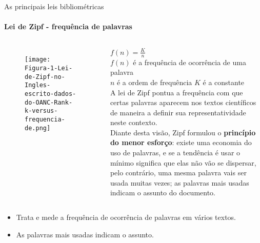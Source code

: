 \begin{frame}[t]{As principais leis bibliométricas}
    \framesubtitle{Lei de Zipf - frequência de palavras}
       
          

    \begin{columns}

        \begin{figure}
            \texttt{[image: Figura-1-Lei-de-Zipf-no-Ingles-escrito-dados-do-OANC-Rank-k-versus-frequencia-de.png]}
        \end{figure}

        \centering
        $f(n) = \frac{K}{n}$\\
        $f(n)$ \scriptsize{é a frequência de ocorrência de uma palavra}\\
        $n$ \scriptsize{é a ordem de frequência}
        $K$ \scriptsize{é a constante}\\

        A lei de Zipf pontua a frequência com que certas palavras aparecem nos textos científicos de maneira a definir sua representatividade neste contexto.\\
        \scriptsize{
            Diante desta visão, Zipf formulou o \textbf{princípio do menor esforço}: existe uma economia do uso de palavras, e se a tendência é usar o mínimo significa que elas não vão se dispersar, pelo contrário, uma mesma palavra vais ser usada muitas vezes; as palavras mais usadas indicam o assunto do documento.
        }
    \end{columns}

    \vspace*{0.2cm}
    \begin{itemize}
        \item Trata e mede a frequência de ocorrência de palavras em vários textos.
        \item As palavras mais usadas indicam o assunto.
    \end{itemize}
\end{frame}
